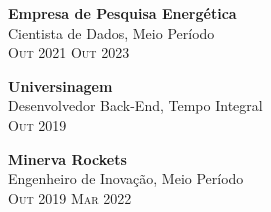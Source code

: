 \documentclass[oneside]{article}
\begin{document}
{\begin{minipage}[t][\dimexpr\textheight-2\fboxrule-2\fboxsep\relax][t]{\dimexpr0.6\textwidth-2\fboxrule-2\fboxsep\relax}
        {\large \textbf{Empresa de Pesquisa Energética}} \\
        {{\selectfont Cientista de Dados, Meio Período}} \\
        {\scshape{}\selectfont\footnotesize Out 2021 \textendash{} Out 2023} 
        \vspace{.3cm}

        {\large \textbf{Universinagem}}\\
        {{\selectfont Desenvolvedor Back-End, Tempo Integral}}\\
        {\scshape{}\selectfont\footnotesize Out 2019 \textendash{} } 
        \vspace{.3cm}

        {\large \textbf{Minerva Rockets}}\\
        {{\selectfont Engenheiro de Inovação, Meio Período}}\\
        {\scshape{}\selectfont\footnotesize Out 2019 \textendash{} Mar 2022} 
        \vspace{.3cm}

\end{minipage}}
\end{document}
